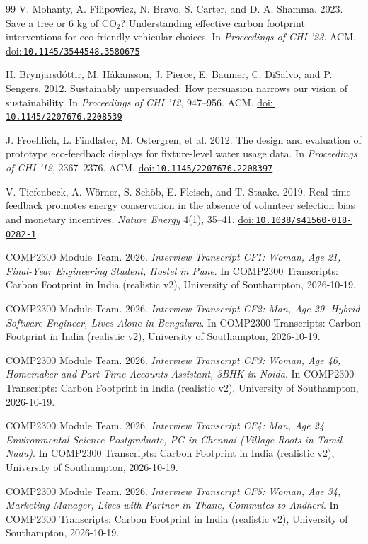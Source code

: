 \documentclass[12pt, a4paper]{article}
\newcommand{\doi}[1]{\href{https://doi.org/#1}{doi:\,\nolinkurl{#1}}}
\begin{document}
\begin{thebibliography}{99}
V. Mohanty, A. Filipowicz, N. Bravo, S. Carter, and D. A. Shamma. 2023. Save a tree or 6 kg of CO$_2$? Understanding effective carbon footprint interventions for eco-friendly vehicular choices. In \emph{Proceedings of CHI '23}. ACM. \doi{10.1145/3544548.3580675}

H. Brynjarsd\'ottir, M. H\r{a}kansson, J. Pierce, E. Baumer, C. DiSalvo, and P. Sengers. 2012. Sustainably unpersuaded: How persuasion narrows our vision of sustainability. In \emph{Proceedings of CHI '12}, 947--956. ACM. \doi{10.1145/2207676.2208539}

J. Froehlich, L. Findlater, M. Ostergren, et al. 2012. The design and evaluation of prototype eco-feedback displays for fixture-level water usage data. In \emph{Proceedings of CHI '12}, 2367--2376. ACM. \doi{10.1145/2207676.2208397}

V. Tiefenbeck, A. W\"orner, S. Sch\"ob, E. Fleisch, and T. Staake. 2019. Real-time feedback promotes energy conservation in the absence of volunteer selection bias and monetary incentives. \emph{Nature Energy} 4(1), 35--41. \doi{10.1038/s41560-018-0282-1}

COMP2300 Module Team. 2026. \textit{Interview Transcript CF1: Woman, Age 21, Final-Year Engineering Student, Hostel in Pune}. In COMP2300 Transcripts: Carbon Footprint in India (realistic v2), University of Southampton, 2026-10-19.

COMP2300 Module Team. 2026. \textit{Interview Transcript CF2: Man, Age 29, Hybrid Software Engineer, Lives Alone in Bengaluru}. In COMP2300 Transcripts: Carbon Footprint in India (realistic v2), University of Southampton, 2026-10-19.

COMP2300 Module Team. 2026. \textit{Interview Transcript CF3: Woman, Age 46, Homemaker and Part-Time Accounts Assistant, 3BHK in Noida}. In COMP2300 Transcripts: Carbon Footprint in India (realistic v2), University of Southampton, 2026-10-19.

COMP2300 Module Team. 2026. \textit{Interview Transcript CF4: Man, Age 24, Environmental Science Postgraduate, PG in Chennai (Village Roots in Tamil Nadu)}. In COMP2300 Transcripts: Carbon Footprint in India (realistic v2), University of Southampton, 2026-10-19.

COMP2300 Module Team. 2026. \textit{Interview Transcript CF5: Woman, Age 34, Marketing Manager, Lives with Partner in Thane, Commutes to Andheri}. In COMP2300 Transcripts: Carbon Footprint in India (realistic v2), University of Southampton, 2026-10-19.


\end{thebibliography}
\end{document}
